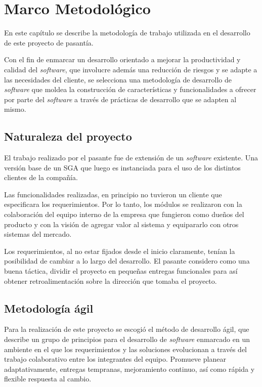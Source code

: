\chapter{Marco Metodológico}
\thispagestyle{empty} %

En este capítulo se describe la metodología de trabajo utilizada en el desarrollo de este proyecto de pasantía.

Con el fin de enmarcar un desarrollo orientado a mejorar la productividad y calidad del \emph{software}, que involucre además una reducción de riesgos y se adapte a las necesidades del cliente, se selecciona una metodología de desarrollo de \emph{software} que moldea la construcción de características y funcionalidades a ofrecer por parte del \emph{software} a través de prácticas de desarrollo que se adapten al mismo.

\section{Naturaleza del proyecto}
El trabajo realizado por el pasante fue de extensión de un \emph{software} existente. Una versión base de un \gls{SGA} que luego es instanciada para el uso de los distintos clientes de la compañía. 

Las funcionalidades realizadas, en principio no tuvieron un cliente que especificara los requerimientos. Por lo tanto, los módulos se realizaron con la colaboración del equipo interno de la empresa que fungieron como dueños del producto y con la visión de agregar valor al sistema y equipararlo con otros sistemas del mercado.

Los requerimientos, al no estar fijados desde el inicio claramente, tenían la posibilidad de cambiar a lo largo del desarrollo. El pasante considero como una buena táctica, dividir el proyecto en pequeñas entregas funcionales para así obtener retroalimentación sobre la dirección que tomaba el proyecto.

\section{Metodología ágil}

Para la realización de este proyecto se escogió el método de desarrollo ágil, que describe un grupo de principios para el desarrollo de \emph{software} enmarcado en un ambiente en el que los requerimientos y las soluciones evolucionan a través del trabajo colaborativo entre los integrantes del equipo. Promueve planear adaptativamente, entregas tempranas, mejoramiento continuo, así como rápida y flexible respuesta al cambio.

